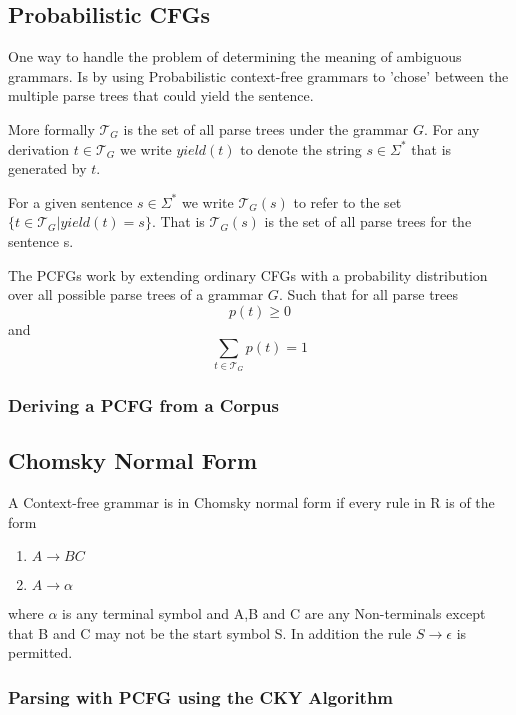 \subsection{Probabilistic CFGs}
One way to handle the problem of determining the meaning of ambiguous grammars.
Is by using Probabilistic context-free grammars to 'chose' between the multiple
parse trees that could yield the sentence. 

More formally $\mathcal{T}_G$ is the set of all parse trees under the grammar $G$.
For any derivation $t \in \mathcal{T}_G$ we write $yield(t)$ to denote the string
$s \in \Sigma^*$ that is generated by $t$. 

For a given sentence $s \in \Sigma^*$ we write $\mathcal{T}_G(s)$ to refer to the
set $\{t \in \mathcal{T}_G \vert yield(t) = s \}$.
That is $\mathcal{T}_G(s)$ is the set of all parse trees for the sentence s.

The PCFGs work by extending ordinary CFGs with a probability distribution over 
all possible parse trees of a grammar $G$. Such that for all parse trees 
$$p(t) \geq 0$$ 
and 
$$\sum_{t \in \mathcal{T}_G}p(t) = 1$$ 

\cite[p.6]{collins}





\subsubsection{Deriving a PCFG from a Corpus}







\subsection{Chomsky Normal Form}
A Context-free grammar is in Chomsky normal form if every rule in R is of the form
\begin{enumerate}
\item $A \rightarrow BC$
\item $A \rightarrow \alpha$
\end{enumerate}

where $\alpha$ is any terminal symbol and A,B and C are any Non-terminals except that B and C may not be the start symbol S.
In addition the rule $S \rightarrow \epsilon$ is permitted.
\cite[p.109]{sipser}







\subsubsection{Parsing with PCFG using the CKY Algorithm}




